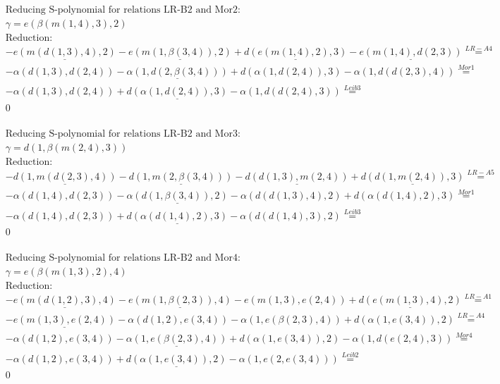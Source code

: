 \documentclass[11pt]{amsart}
\begin{document}
\begin{align*} 
& \text{Reducing S-polynomial for relations LR-B2 and Mor2:} \\ 
& \gamma = e(\beta(m(1,4),3),2) \\ 
& \text{Reduction}: \\& - \underline{e(m(d(1,3),4),2)} - \underline{e(m(1,\beta(3,4)),2)} + \underline{d(e(m(1,4),2),3)} - \underline{e(m(1,4),d(2,3))} \stackrel{ LR-A4 }{=}  \\ 
& - \alpha(d(1,3),d(2,4)) - \underline{\alpha(1,d(2,\beta(3,4)))} + d(\alpha(1,d(2,4)),3) - \alpha(1,d(d(2,3),4)) \stackrel{ Mor1 }{=}  \\ 
& - \alpha(d(1,3),d(2,4)) + \underline{d(\alpha(1,d(2,4)),3)} - \alpha(1,d(d(2,4),3)) \stackrel{ Leib3 }{=}  \\ 
&0\\ 
\end{align*} 
 
\begin{align*} 
& \text{Reducing S-polynomial for relations LR-B2 and Mor3:} \\ 
& \gamma = d(1,\beta(m(2,4),3)) \\ 
& \text{Reduction}: \\& - \underline{d(1,m(d(2,3),4))} - \underline{d(1,m(2,\beta(3,4)))} - \underline{d(d(1,3),m(2,4))} + \underline{d(d(1,m(2,4)),3)} \stackrel{ LR-A5 }{=}  \\ 
& - \alpha(d(1,4),d(2,3)) - \underline{\alpha(d(1,\beta(3,4)),2)} - \alpha(d(d(1,3),4),2) + d(\alpha(d(1,4),2),3) \stackrel{ Mor1 }{=}  \\ 
& - \alpha(d(1,4),d(2,3)) + \underline{d(\alpha(d(1,4),2),3)} - \alpha(d(d(1,4),3),2) \stackrel{ Leib3 }{=}  \\ 
&0\\ 
\end{align*} 
 
\begin{align*} 
& \text{Reducing S-polynomial for relations LR-B2 and Mor4:} \\ 
& \gamma = e(\beta(m(1,3),2),4) \\ 
& \text{Reduction}: \\& - \underline{e(m(d(1,2),3),4)} - \underline{e(m(1,\beta(2,3)),4)} - e(m(1,3),e(2,4)) + \underline{d(e(m(1,3),4),2)} \stackrel{ LR-A1 }{=}  \\ 
& - \underline{e(m(1,3),e(2,4))} - \alpha(d(1,2),e(3,4)) - \alpha(1,e(\beta(2,3),4)) + d(\alpha(1,e(3,4)),2) \stackrel{ LR-A4 }{=}  \\ 
& - \alpha(d(1,2),e(3,4)) - \underline{\alpha(1,e(\beta(2,3),4))} + d(\alpha(1,e(3,4)),2) - \alpha(1,d(e(2,4),3)) \stackrel{ Mor4 }{=}  \\ 
& - \alpha(d(1,2),e(3,4)) + \underline{d(\alpha(1,e(3,4)),2)} - \alpha(1,e(2,e(3,4))) \stackrel{ Leib2 }{=}  \\ 
&0\\ 
\end{align*} 
 
\end{document}
